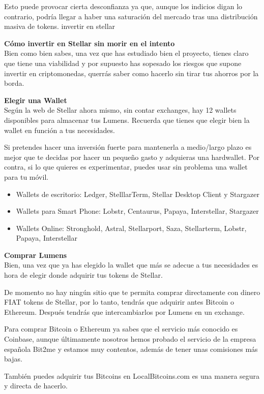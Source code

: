 \documentclass[a4paper,12pt]{/home/armando/Documentos/Cursos/LaTeX/Plantillas/lib/pub}
\begin{document}
	Esto puede provocar cierta desconfianza ya que, aunque los indicios digan lo contrario, podría llegar a haber una saturación del mercado tras una distribución masiva de tokens.
	invertir en stellar
	
	
	\textbf{Cómo invertir en Stellar sin morir en el intento}\\
	
	Bien como bien sabes, una vez que has estudiado bien el proyecto, tienes claro que tiene una viabilidad y por supuesto has sopesado los riesgos que supone invertir en criptomonedas, querrás saber como hacerlo sin tirar tus ahorros por la borda.
	
	\textbf{Elegir una Wallet}\\
	Según la web de Stellar ahora mismo, sin contar exchanges, hay 12 wallets disponibles para almacenar tus Lumens. Recuerda que tienes que elegir bien la wallet en función a tus necesidades.
	
	Si pretendes hacer una inversión fuerte para mantenerla a medio/largo plazo es mejor que te decidas por hacer un pequeño gasto y adquieras una hardwallet. Por contra, si lo que quieres es experimentar, puedes usar sin problema una wallet para tu móvil.
	\begin{itemize}
		\item Wallets de escritorio: Ledger, StelllarTerm, Stellar Desktop Client y Stargazer
		\item Wallets para Smart Phone: Lobstr, Centaurus, Papaya, Interstellar, Stargazer
		\item Wallets Online: Stronghold, Astral, Stellarport, Saza, Stellarterm, Lobstr, Papaya, Interstellar
	\end{itemize}
	\textbf{Comprar Lumens}\\
	Bien, una vez que ya has elegido la wallet que más se adecue a tus necesidades es hora de elegir donde adquirir tus tokens de Stellar.
	
	De momento no hay ningún sitio que te permita comprar directamente con dinero FIAT tokens de Stellar, por lo tanto, tendrás que adquirir antes Bitcoin o Ethereum. Después tendrás que intercambiarlos por Lumens en un exchange.
	
	Para comprar Bitcoin o Ethereum ya sabes que el servicio más conocido es Coinbase, aunque últimamente nosotros hemos probado el servicio de la empresa española Bit2me y estamos muy contentos, además de tener unas comisiones más bajas.
	
	También puedes adquirir tus Bitcoins en LocalBitcoins.com es una manera segura y directa de hacerlo.
	
\end{document}
